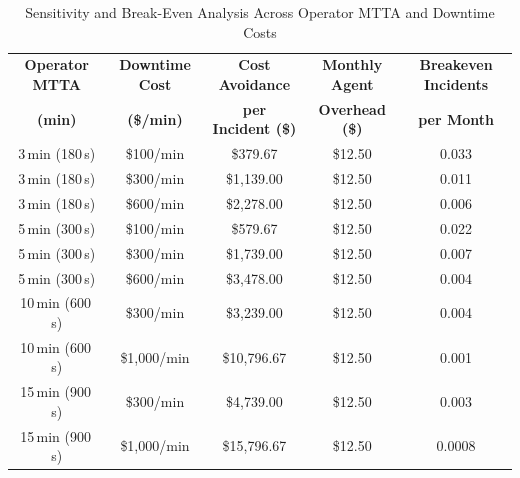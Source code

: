 \begin{table}[t]
\caption{Sensitivity and Break-Even Analysis Across Operator MTTA and Downtime Costs}
\label{tab:sensitivity_breakeven}
\centering
\small
\renewcommand{\arraystretch}{1.2}
\begin{tabular}{ccccc}
\hline
\textbf{Operator MTTA} & \textbf{Downtime Cost} & \textbf{Cost Avoidance} & \textbf{Monthly Agent} & \textbf{Breakeven Incidents} \\
\textbf{(min)} & \textbf{(\$/min)} & \textbf{per Incident (\$)} & \textbf{Overhead (\$)} & \textbf{per Month} \\
\hline
3\,min (180\,s) & \$100/min & \$379.67 & \$12.50 & 0.033 \\
3\,min (180\,s) & \$300/min & \$1,139.00 & \$12.50 & 0.011 \\
3\,min (180\,s) & \$600/min & \$2,278.00 & \$12.50 & 0.006 \\
5\,min (300\,s) & \$100/min & \$579.67 & \$12.50 & 0.022 \\
5\,min (300\,s) & \$300/min & \$1,739.00 & \$12.50 & 0.007 \\
5\,min (300\,s) & \$600/min & \$3,478.00 & \$12.50 & 0.004 \\
10\,min (600\,s) & \$300/min & \$3,239.00 & \$12.50 & 0.004 \\
10\,min (600\,s) & \$1,000/min & \$10,796.67 & \$12.50 & 0.001 \\
15\,min (900\,s) & \$300/min & \$4,739.00 & \$12.50 & 0.003 \\
15\,min (900\,s) & \$1,000/min & \$15,796.67 & \$12.50 & 0.0008 \\
\hline
\end{tabular}
\end{table}